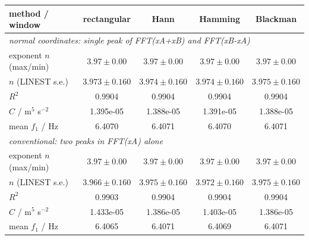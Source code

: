\begin{tabular}{@{}lcccc@{}}
\toprule
method / window & rectangular & Hann & Hamming & Blackman \\
\midrule
\multicolumn{5}{l}{\emph{normal coordinates: single peak of FFT(xA+xB) and FFT(xB-xA)}} \\
exponent $n$ (max/min) & $3.97\pm0.00$ & $3.97\pm0.00$ & $3.97\pm0.00$ & $3.97\pm0.00$ \\
$n$ (LINEST s.e.) & $3.973\pm0.160$ & $3.974\pm0.160$ & $3.974\pm0.160$ & $3.975\pm0.160$ \\
$R^2$ & 0.9904 & 0.9904 & 0.9904 & 0.9904 \\
$C$ / m$^5$ s$^{-2}$ & 1.395e-05 & 1.388e-05 & 1.391e-05 & 1.388e-05 \\
mean $f_1$ / Hz & 6.4070 & 6.4071 & 6.4070 & 6.4071 \\
\midrule
\multicolumn{5}{l}{\emph{conventional: two peaks in FFT(xA) alone}} \\
exponent $n$ (max/min) & $3.97\pm0.00$ & $3.97\pm0.00$ & $3.97\pm0.00$ & $3.97\pm0.00$ \\
$n$ (LINEST s.e.) & $3.966\pm0.160$ & $3.975\pm0.160$ & $3.972\pm0.160$ & $3.975\pm0.160$ \\
$R^2$ & 0.9903 & 0.9904 & 0.9904 & 0.9904 \\
$C$ / m$^5$ s$^{-2}$ & 1.433e-05 & 1.386e-05 & 1.403e-05 & 1.386e-05 \\
mean $f_1$ / Hz & 6.4065 & 6.4071 & 6.4069 & 6.4071 \\
\bottomrule
\end{tabular}